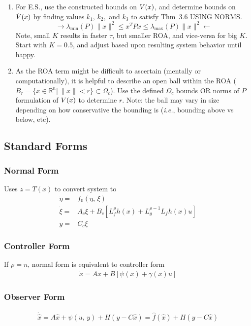 \documentclass[twocolumn]{article}    %
\begin{document}
\begin{enumerate}
    \item For E.S., use the constructed bounds on \(V(x)\), and determine bounds on \(\dot{V}(x)\) by finding values \(k_1,\, k_2,\) and \(k_3\) to satisfy Thm~3.6 USING NORMS. 
    \begin{equation*}
        \longrightarrow \lambda_{\min} (P) \|x\|^2 \leq x^TPx \leq \lambda_{\max}(P) \|x\|^2 \longleftarrow
    \end{equation*}
    Note, small \(K\) results in faster \(\tau\), but smaller ROA, and vice-versa for big \(K\). Start with \(K=0.5\), and adjust based upon resulting system behavior until happy.

    \item As the ROA term might be difficult to ascertain (mentally or computationally), it is helpful to describe an open ball within the ROA (\(B_r = \{x \in \mathds{R}^n |\, \|x\| < r\} \subset \Omega_c\)). Use the defined \(\Omega_c\) bounds OR norms of \(P\) formulation of \(V(x)\) to determine \(r\). Note: the ball may vary in size depending on how conservative the bounding is (\textit{i.e.}, bounding above vs below, etc).
\end{enumerate}

\subsection*{Standard Forms}
\subsubsection*{Normal Form}
Uses \(z =T(x)\) to convert system to 
\begin{align*}
    \dot{\eta} =& f_0(\eta,\, \xi)\\
    \dot{\xi} =& A_c\xi + B_c \left[L_f^\rho h(x) + L_g^{\rho-1}L_f h (x)u\right]\\
    y =& C_c\xi
\end{align*}
\subsubsection*{Controller Form}
If \(\rho=n\), normal form is equivalent to controller form
\begin{align*}
    \dot{x} = Ax + B[\psi(x) + \gamma(x)u]
\end{align*}
\subsubsection*{Observer Form}
\begin{align*}
    \dot{\hat{x}} = A\hat{x} + \psi(u,\,y) + H(y-C\hat{x}) = \hat{f}(\hat{x}) + H(y - C\hat{x})
\end{align*}
\end{document}
